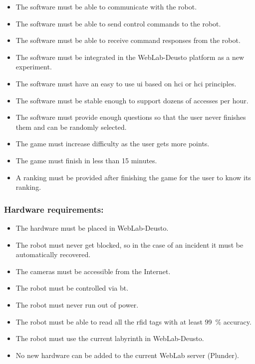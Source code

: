\begin{itemize}
	\item The software must be able to communicate with the robot.
	\item The software must be able to send control commands to the robot.
	\item The software must be able to receive command responses from the robot.
	\item The software must be integrated in the WebLab-Deusto platform as a new experiment.
	\item The software must have an easy to use \acrshort{ui} based on \acrlong{hci} or
	\acrshort{hci} principles.
	\item The software must be stable enough to support dozens of accesses per hour.
	\item The software must provide enough questions so that the user never finishes them and can be
	randomly selected.
	\item The game must increase difficulty as the user gets more points.
	\item The game must finish in less than 15 minutes.
	\item A ranking must be provided after finishing the game for the user to know its ranking.
\end{itemize}

\subsubsection{Hardware requirements:}

\begin{itemize}
	\item The hardware must be placed in WebLab-Deusto.
	\item The robot must never get blocked, so in the case of an incident it must be automatically
	recovered.
	\item The cameras must be accessible from the Internet.
	\item The robot must be controlled via \acrlong{bt}.
	\item The robot must never run out of power.
	\item The robot must be able to read all the \acrshort{rfid} tags with at least 99~\% accuracy.
	\item The robot must use the current labyrinth in WebLab-Deusto.
	\item No new hardware can be added to the current WebLab server (Plunder).
\end{itemize}


